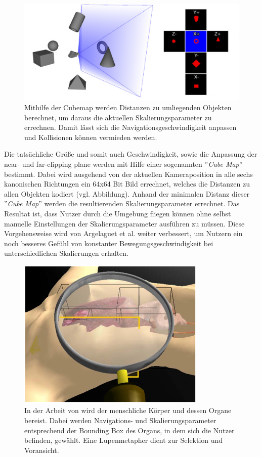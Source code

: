 \begin{figure}[h]
  \centering
  \includegraphics[width=\textwidth]{images/cubemap2.png}
  \caption{Mithilfe der Cubemap werden Distanzen zu umliegenden Objekten berechnet, um daraus die aktuellen Skalierungsparameter zu errechnen. Damit lässt sich die Navigationsgeschwindigkeit anpassen und Kollisionen können vermieden werden. \cite{McCrae2009MultiscaleNavigationb}}
  \label{fig:todo}
\end{figure}

Die tatsächliche Größe und somit auch Geschwindigkeit, sowie die Anpassung der near- und far-clipping plane werden mit Hilfe einer sogenannten ”\textit{Cube Map}” bestimmt. Dabei wird ausgehend von der aktuellen Kameraposition in alle sechs kanonischen Richtungen ein 64x64 Bit Bild errechnet, welches die Distanzen zu allen Objekten kodiert (vgl. Abbildung). Anhand der minimalen Distanz dieser ”\textit{Cube Map}” werden die resultierenden Skalierungsparameter errechnet.
Das Resultat ist, dass Nutzer durch die Umgebung fliegen können ohne selbst manuelle Einstellungen der Skalierungsparameter ausführen zu müssen. Diese Vorgehensweise wird von Argelaguet et al. \cite{Dallat2018Giant} weiter verbessert, um Nutzern ein noch besseres Gefühl von konstanter Bewegungsgeschwindigkeit bei unterschiedlichen Skalierungen erhalten.

\begin{figure}[h]
  \centering
  \includegraphics[width=0.8\textwidth]{images/body.png}
  \caption{In der Arbeit von \cite{Kopper2006DesignEnvironments} wird der menschliche Körper und dessen Organe bereist. Dabei werden Navigations- und Skalierungsparameter entsprechend der Bounding Box des Organs, in dem sich die Nutzer befinden, gewählt. Eine Lupenmetapher dient zur Selektion und Voransicht.}
  \label{fig:todo}
\end{figure}


